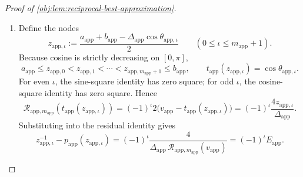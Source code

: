 \begin{proof}[Proof of \cref{obj:lem:reciprocal-best-approximation}]
\begin{enumerate}
\item Define the nodes
\[
z_{\mathrm{app},\iota}:=
\frac{a_{\mathrm{app}}+b_{\mathrm{app}}
-\Delta_{\mathrm{app}}\cos\theta_{\mathrm{app},\iota}}{2}
\qquad(0\le\iota\le m_{\mathrm{app}}+1).
\]
Because cosine is strictly decreasing on \([0,\pi]\),
\[
a_{\mathrm{app}}\le z_{\mathrm{app},0}
<z_{\mathrm{app},1}<\cdots
<z_{\mathrm{app},m_{\mathrm{app}}+1}\le b_{\mathrm{app}},
\qquad
t_{\mathrm{app}}(z_{\mathrm{app},\iota})
=\cos\theta_{\mathrm{app},\iota}.
\]
For even \(\iota\), the sine-square identity has zero square; for odd \(\iota\), the cosine-square identity has zero square. Hence
\[
\mathcal R_{\mathrm{app},m_{\mathrm{app}}}
(t_{\mathrm{app}}(z_{\mathrm{app},\iota}))
=
(-1)^\iota
2\bigl(v_{\mathrm{app}}-t_{\mathrm{app}}(z_{\mathrm{app},\iota})\bigr)
=
(-1)^\iota\frac{4z_{\mathrm{app},\iota}}{\Delta_{\mathrm{app}}}.
\]
Substituting into the residual identity gives
\[
z_{\mathrm{app},\iota}^{-1}
-p_{\mathrm{app}}(z_{\mathrm{app},\iota})
=
(-1)^\iota
\frac{4}
{\Delta_{\mathrm{app}}\,
\mathcal R_{\mathrm{app},m_{\mathrm{app}}}(v_{\mathrm{app}})}
=
(-1)^\iota E_{\mathrm{app}}.
\]


\end{enumerate}
\end{proof}
